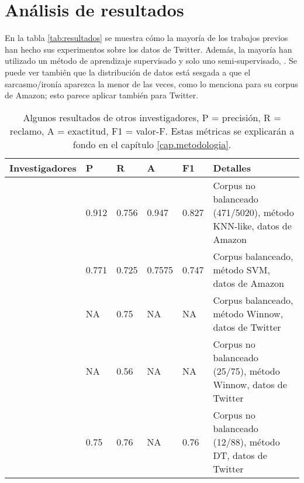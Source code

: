 \section{Análisis de resultados}

\par En la tabla \ref{tab:resultados} se muestra cómo la mayoría de los trabajos previos han hecho sus experimentos sobre los datos de Twitter. Además, la mayoría han utilizado un método de aprendizaje supervisado y solo uno semi-supervisado, \textcite{davidov2010semi}. Se puede ver también que la distribución de datos está sesgada a que el sarcasmo/ironía aparezca la menor de las veces, como lo menciona \textcite{liu2007low} para su corpus de Amazon; esto parece aplicar también para Twitter.


\begin{table}[!ht]
	\caption{Algunos resultados de otros investigadores, P  = precisión, R = reclamo, A = exactitud, F1 = valor-F. Estas métricas se explicarán a fondo en el capítulo \ref{cap.metodologia}.}
	\begin{tabular}{|l|l|l|l|l|>{\raggedleft\arraybackslash}p{4cm}|}
		\hline
		Investigadores                  & P     & R     & A      & F1    & Detalles                                                                                  \\ \hline
		\textcite{davidov2010semi}      & 0.912 & 0.756 & 0.947  & 0.827 & Corpus no balanceado (471/5020), método  KNN-like, datos de Amazon                        \\ \hline
		\textcite{reyes2012making}      & 0.771 & 0.725 & 0.7575 & 0.747 & Corpus balanceado, método SVM, datos de  Amazon                                           \\ \hline
		\textcite{liebrecht2013perfect} & NA    & 0.75  & NA     & NA    & Corpus balanceado, método Winnow, datos de Twitter                                        \\ \hline
		\textcite{liebrecht2013perfect} & NA    & 0.56  & NA     & NA    & Corpus no balanceado (25/75), método Winnow, datos de Twitter                             \\ \hline
		\textcite{barbieri2014italian}  & 0.75  & 0.76  & NA     & 0.76  & Corpus no balanceado (12/88), método \gls{DT}, datos de  Twitter                          \\ \hline


\end{tabular}
\end{table}
